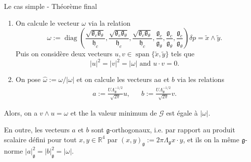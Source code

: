 \documentclass[10pt, envcountsect]{beamer}
\theoremstyle{plain}
\newcommand{\R}{\mathbb{R}}
\DeclareMathOperator{\diag}{diag}
\DeclareMathOperator{\Span}{span}
\begin{document}
\begin{frame}{Le cas simple - Théorème final}
\begin{enumerate}
\item On calcule le vecteur $\omega$ via la relation
\begin{equation}
\omega := \diag \left (\frac{\sqrt{\mathfrak{g}_c \mathfrak{g}_{\theta}}}{\mathfrak{h}_c}, \frac{\sqrt{\mathfrak{g}_c \mathfrak{g}_{\theta}}}{\mathfrak{h}_c}, \frac{\sqrt{\mathfrak{g}_c \mathfrak{g}_{\theta}}}{\mathfrak{h}_c}, \frac{\mathfrak{g}_c}{\mathfrak{g}_\theta}, \frac{\mathfrak{g}_c}{\mathfrak{g}_\theta}, \frac{\mathfrak{g}_c}{\mathfrak{g}_\theta} \right ) \delta p = \tilde{x} \wedge \tilde{y}.
\end{equation}
Puis on considère deux vecteurs $u,v \in \Span\{\tilde{x}, \tilde{y}\}$ tels que
\begin{equation}
\label{eq:global minimizer condition}
|u|^2 = |v|^2 = |\omega| \text{ and } u \cdot v = 0.
\end{equation}

\item On pose $\hat{\omega} := \omega/|\omega|$ et on calcule les vecteurs a$a$ et $b$ via les relations
\begin{equation}
\label{eq:global minimizer form}
\begin{aligned}
a := \frac{U \Lambda_{\mathfrak{g}}^{-1/2}}{\sqrt{2 \pi}} u,&& b := \frac{U \Lambda_{\mathfrak{g}}^{-1/2}}{\sqrt{2 \pi}} v.
\end{aligned}
\end{equation}
\end{enumerate}
Alors, on a $ v \wedge u = \omega$ et the la valeur minimum de $\mathcal{G}$ est égale à $|\omega|$.

En outre, les vecteurs $a$ et $b$ sont $\mathfrak{g}$-orthogonaux, i.e. par rapport au produit scalaire défini pour tout $x,y \in \R^4$ par $(x, y)_{\mathfrak{g}} := 2 \pi \Lambda_{\mathfrak{g}} x \cdot y$, et ils on la même $\mathfrak{g}$-norme $|a|_{\mathfrak{g}}^2 = |b|_{\mathfrak{g}}^2 = |\omega|$. 
\end{frame}
\end{document}
